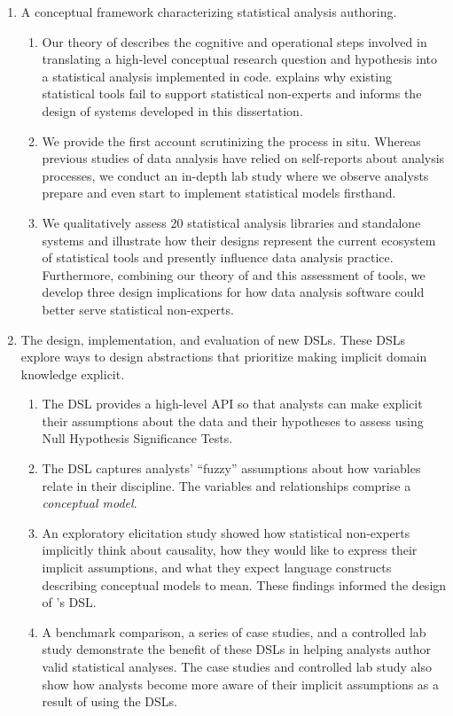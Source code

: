 \begin{enumerate} 
    \item A conceptual framework characterizing statistical analysis authoring.
    \begin{enumerate}
        \item Our theory of \hypoForm describes the cognitive and operational
        steps involved in translating a high-level conceptual research question
        and hypothesis into a statistical analysis implemented in code.
        \HypoForm explains why existing statistical
        tools fail to support statistical non-experts and informs the design
        of systems developed in this dissertation.
        \item We provide the first account scrutinizing the \hypoForm process in
        situ. Whereas previous studies of data analysis have relied on
        self-reports about analysis processes, we conduct an in-depth lab study where we
        observe analysts prepare and even start to implement statistical
        models firsthand. 
        \item We qualitatively assess 20 statistical analysis libraries and
        standalone systems and illustrate how their designs represent the
        current ecosystem of statistical tools and presently influence data
        analysis practice. Furthermore, combining our theory of \hypoForm and
        this assessment of tools, we develop three design implications for how
        data analysis software could better serve statistical non-experts. 
    \end{enumerate}

    \item The design, implementation, and evaluation of new DSLs. These DSLs
    explore ways to design abstractions that prioritize making implicit domain
    knowledge explicit. 
    \begin{enumerate}
        \item The \tea DSL provides a high-level API so that analysts can make
        explicit their assumptions about the data and their hypotheses to assess
        using Null Hypothesis Significance Tests. 
        \item The \tisane DSL captures analysts' ``fuzzy'' assumptions about how
        variables relate in their discipline. The variables and relationships
        comprise a \textit{conceptual model}.
        \item An exploratory elicitation study showed how statistical non-experts implicitly
        think about causality, how they would like to express their implicit
        assumptions, and what they expect language constructs describing
        conceptual models to mean. These findings informed the design of \rTisane's DSL.
        \item A benchmark comparison, a series of case studies, and a controlled
        lab study demonstrate the benefit of these DSLs in helping analysts
        author valid statistical analyses. The case studies and controlled lab
        study also show how analysts become more aware of their implicit assumptions as a result of using the DSLs.
    \end{enumerate}


\end{enumerate}
